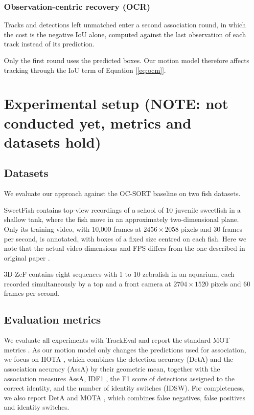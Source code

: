 \documentclass[9pt,twoside]{pnas-new}
\begin{document}
\subsubsection*{Observation-centric recovery (OCR)}
Tracks and detections left unmatched enter a second association round, in which the cost is the negative IoU alone, computed against the last observation of each track instead of its prediction. 

Only the first round uses the predicted boxes.
Our motion model therefore affects tracking through the IoU term of Equation [\ref{eq:ocm}].

\section*{Experimental setup (NOTE: not conducted yet, metrics and datasets hold)}
\subsection*{Datasets}
We evaluate our approach against the OC-SORT \cite{ocsort} baseline on two fish datasets.

SweetFish \cite{sweetfish} contains top-view recordings of a school of 10 juvenile sweetfish in a shallow tank, where the fish move in an approximately two-dimensional plane.
Only its training video, with 10{,}000 frames at $2456 \times 2058$ pixels and 30 frames per second, is annotated, with boxes of a fixed size centred on each fish.
Here we note that the actual video dimensions and FPS differs from the one described in original paper \cite{sweetfish}.

3D-ZeF \cite{3dzef} contains eight sequences with 1 to 10 zebrafish in an aquarium, each recorded simultaneously by a top and a front camera at $2704 \times 1520$ pixels and 60 frames per second. 


\subsection*{Evaluation metrics}
We evaluate all experiments with TrackEval \cite{trackeval} and report the standard MOT metrics \cite{mot_metrics}.
As our motion model only changes the predictions used for association, we focus on HOTA \cite{hota}, which combines the detection accuracy (DetA) and the association accuracy (AssA) by their geometric mean, together with the association measures AssA, IDF1 \cite{idf1}, the F1 score of detections assigned to the correct identity, and the number of identity switches (IDSW). 
For completeness, we also report DetA and MOTA \cite{clear}, which combines false negatives, false positives and identity switches.
\end{document}
